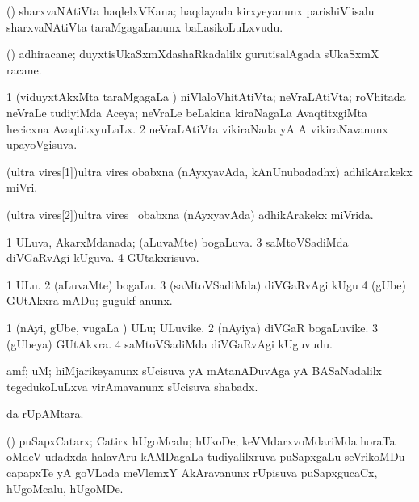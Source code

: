 \bentry
{}
\gl{\nA}
\expl{}
\bmng
(\veYshA) sharxvaNAtiVta haqlelxVKana; haqdayada kirxyeyanunx parishiVlisalu sharxvaNAtiVta taraMgagaLanunx baLasikoLuLxvudu. 
\emng
\eentry

\bentry
{} 
\gl{\nA}
\expl{}
\bmng
(\jiVvi) adhiracane; duyxtisUkaSxmXdashaRkadalilx  gurutisalAgada sUkaSxmX racane. 
\emng
\eentry

\bentry
{} 
\gl{\gu}
\expl{}
\bmng
\bnum
\num{1} (viduyxtAkxMta taraMgagaLa \vi) niVlaloVhitAtiVta; neVraLAtiVta; roVhitada neVraLe tudiyiMda Aceya; neVraLe beLakina kiraNagaLa AvaqtitxgiMta hecicxna AvaqtitxyuLaLx. 
\num{2} neVraLAtiVta vikiraNada yA A vikiraNavanunx upayoVgisuva. 
\enum
\emng
\eentry

\bentry
\wordf(ultra vires[1]){ultra vires} 
\gl{\kirxvi}
\expl{\Latin}
\bmng
obabxna (nAyxyavAda, kAnUnubadadhx) adhikArakekx miVri. 
\emng
\eentry

\bentry
\wordf(ultra vires[2]){ultra vires} 
\gl{\gu}
\expl{\Latin}
\bmng
\kanu\ obabxna (nAyxyavAda) adhikArakekx miVrida. 
\emng
\eentry

\bentry
{} 
\gl{\gu}
\expl{}
\bmng
\bnum
\num{1} ULuva, AkarxMdanada; (aLuvaMte) bogaLuva. 
\num{3} saMtoVSadiMda diVGaRvAgi kUguva. 
\num{4} GUtakxrisuva. 
\enum
\emng
\eentry

\bentry
{}
\gl{\akirx}
\expl{}
\bmng
\bnum
\num{1} ULu. 
\num{2} (aLuvaMte) bogaLu. 
\num{3} (saMtoVSadiMda) diVGaRvAgi kUgu 
\num{4} (gUbe) GUtAkxra mADu; gugukf anunx. 
\enum
\emng
\eentry

\bentry
{} 
\gl{\nA}
\expl{}
\bmng
\bnum
\num{1} (nAyi, gUbe, \mo vugaLa \vi) ULu; ULuvike. 
\num{2} (nAyiya) diVGaR bogaLuvike. 
\num{3} (gUbeya) GUtAkxra. 
\num{4} saMtoVSadiMda diVGaRvAgi kUguvudu. 
\enum
\emng
\eentry

\bentry
{}
\gl{\BAavayx}
\bmng
amf; uM; hiMjarikeyanunx sUcisuva yA mAtanADuvAga yA BASaNadalilx tegedukoLuLxva virAmavanunx sUcisuva shabadx. 
\emng
\eentry

\bentry
{}
\gl{\uparx}
\expl{}
\bmng
{} \uparx da rUpAMtara. 
\emng
\eentry

\bentry
{} 
\gl{\nA}
\expl{}
\bmng
(\savi) puSapxCatarx; Catirx hUgoMcalu; hUkoDe; keVMdarxvoMdariMda horaTa oMdeV udadxda halavAru kAMDagaLa tudiyalilxruva puSapxgaLu seVrikoMDu capapxTe yA goVLada meVlemxY AkAravanunx rUpisuva puSapxgucaCx, hUgoMcalu, hUgoMDe. 
\emng
\eentry

